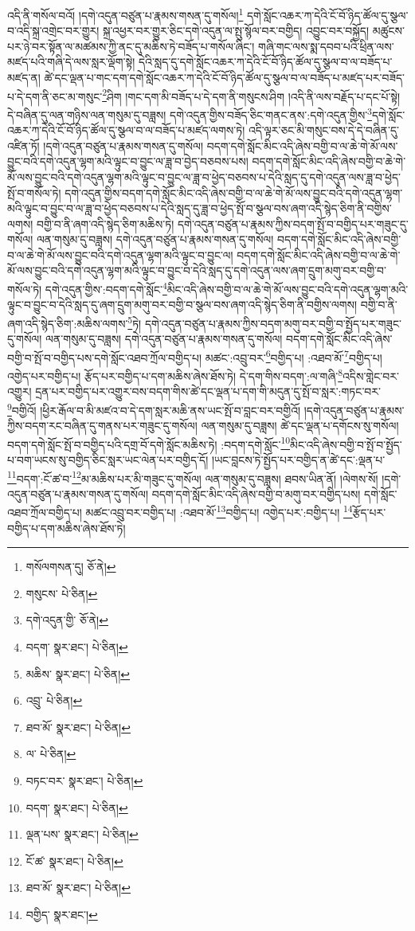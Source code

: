 འདི་ནི་གསོལ་བའོ། །དགེ་འདུན་བཙུན་པ་རྣམས་གསན་དུ་གསོལ།\footnote{གསོལགསན་དུ།  ཅོ་ནེ། } དགེ་སློང་འཆར་ཀ་དེའི་ངོ་བོ་ཉིད་ཚོལ་དུ་སྩལ་བ་འདི་སྐྲ་འགྲེང་བར་གྱུར། སྐྲ་འཕྱར་བར་གྱུར་ཅིང་དགེ་འདུན་ལ་སྤུ་སྙོལ་བར་བགྱིད། འབྱུང་བར་བསྐྱོད། མཚུངས་པར་ཉེ་བར་སྟོན་ལ་མཚམས་ཀྱི་ནང་དུ་མཆིས་ཏེ་བཟོད་པ་གསོལ་ཞིང་། གཞི་གང་ལས་སྨ་དབབ་པའི་ཕྲིན་ལས་མཛད་པའི་གཞི་དེ་ལས་སླར་ལྡོག་སྟེ། དེའི་སླད་དུ་དགེ་སློང་འཆར་ཀ་དེའི་ངོ་བོ་ཉིད་ཚོལ་དུ་སྩལ་བ་ལ་བཟོད་པ་མཛད་ན། ཚེ་དང་ལྡན་པ་གང་དག་དགེ་སློང་འཆར་ཀ་དེའི་ངོ་བོ་ཉིད་ཚོལ་དུ་སྩལ་བ་ལ་བཟོད་པ་མཛད་པར་བཟོད་པ་དེ་དག་ནི་ཅང་མ་གསུང་\footnote{གསུངས་  པེ་ཅིན། }ཤིག །གང་དག་མི་བཟོད་པ་དེ་དག་ནི་གསུངས་ཤིག །འདི་ནི་ལས་བརྗོད་པ་དང་པོ་སྟེ། དེ་བཞིན་དུ་ལན་གཉིས་ལན་གསུམ་དུ་བཟླས། དགེ་འདུན་གྱིས་བཟོད་ཅིང་གནང་ནས་:དགེ་འདུན་གྱིས་\footnote{དགེ་འདུན་གྱི་  ཅོ་ནེ། }དགེ་སློང་འཆར་ཀ་དེའི་ངོ་བོ་ཉིད་ཚོལ་དུ་སྩལ་བ་ལ་བཟོད་པ་མཛད་ལགས་ཏེ། འདི་ལྟར་ཅང་མི་གསུང་བས་དེ་དེ་བཞིན་དུ་འཛིན་ཏོ། །དགེ་འདུན་བཙུན་པ་རྣམས་གསན་དུ་གསོལ། བདག་དགེ་སློང་མིང་འདི་ཞེས་བགྱི་བ་ལ་ཆེ་གེ་མོ་ལས་བྱུང་བའི་དགེ་འདུན་ལྷག་མའི་ལྟུང་བ་བྱུང་ལ་ཟླ་བ་བྱེད་བཅབས་པས། བདག་དགེ་སློང་མིང་འདི་ཞེས་བགྱི་བ་ཆེ་གེ་མོ་ལས་བྱུང་བའི་དགེ་འདུན་ལྷག་མའི་ལྟུང་བ་བྱུང་ལ་ཟླ་བ་ཕྱེད་བཅབས་པ་དེའི་སླད་དུ་དགེ་འདུན་ལས་ཟླ་བ་ཕྱེད་སྤོ་བ་གསོལ་ཏེ། དགེ་འདུན་གྱིས་བདག་དགེ་སློང་མིང་འདི་ཞེས་བགྱི་བ་ལ་ཆེ་གེ་མོ་ལས་བྱུང་བའི་དགེ་འདུན་ལྷག་མའི་ལྟུང་བ་བྱུང་བ་ལ་ཟླ་བ་ཕྱེད་བཅབས་པ་དེའི་སླད་དུ་ཟླ་བ་ཕྱེད་སྤོ་བ་སྩལ་བས་ཞག་འདི་སྙེད་ཅིག་ནི་བགྱིས་ལགས། བགྱི་བ་ནི་ཞག་འདི་སྙེད་ཅིག་མཆིས་ཏེ། དགེ་འདུན་བཙུན་པ་རྣམས་ཀྱིས་བདག་སྤོ་བ་བགྱིད་པར་གཟུང་དུ་གསོལ། ལན་གསུམ་དུ་བཟླས། དགེ་འདུན་བཙུན་པ་རྣམས་གསན་དུ་གསོལ། བདག་དགེ་སློང་མིང་འདི་ཞེས་བགྱི་བ་ལ་ཆེ་གེ་མོ་ལས་བྱུང་བའི་དགེ་འདུན་ལྷག་མའི་ལྟུང་བ་བྱུང་ལ། བདག་དགེ་སློང་མིང་འདི་ཞེས་བགྱི་བ་ལ་ཆེ་གེ་མོ་ལས་བྱུང་བའི་དགེ་འདུན་ལྷག་མའི་ལྟུང་བ་བྱུང་བ་དེའི་སླད་དུ་དགེ་འདུན་ལས་ཞག་དྲུག་མགུ་བར་བགྱི་བ་གསོལ་ཏེ། དགེ་འདུན་གྱིས་:བདག་དགེ་སློང་\footnote{བདག་  སྣར་ཐང་།  པེ་ཅིན། }མིང་འདི་ཞེས་བགྱི་བ་ལ་ཆེ་གེ་མོ་ལས་བྱུང་བའི་དགེ་འདུན་ལྷག་མའི་ལྟུང་བ་བྱུང་བ་དེའི་སླད་དུ་ཞག་དྲུག་མགུ་བར་བགྱི་བ་སྩལ་བས་ཞག་འདི་སྙེད་ཅིག་ནི་བགྱིས་ལགས། བགྱི་བ་ནི་ཞག་འདི་སྙེད་ཅིག་:མཆིས་ལགས་\footnote{མཆིས་  སྣར་ཐང་།  པེ་ཅིན། }ཏེ། དགེ་འདུན་བཙུན་པ་རྣམས་ཀྱིས་བདག་མགུ་བར་བགྱི་བ་སྤྱོད་པར་གཟུང་དུ་གསོལ། ལན་གསུམ་དུ་བཟླས། དགེ་འདུན་བཙུན་པ་རྣམས་གསན་དུ་གསོལ། བདག་དགེ་སློང་མིང་འདི་ཞེས་བགྱི་བ་སྤོ་བ་བགྱིད་པས་དགེ་སློང་འཐབ་ཀྲོལ་བགྱིད་པ། མཚང་:འབྲུ་བར་\footnote{འབྲུ་  པེ་ཅིན། }བགྱིད་པ། :འཐབ་མོ་\footnote{ཐབ་མོ་  སྣར་ཐང་།  པེ་ཅིན། }བགྱིད་པ། འགྱེད་པར་བགྱིད་པ། རྩོད་པར་བགྱིད་པ་དག་མཆིས་ཞེས་ཐོས་ཏེ། དེ་དག་གིས་བདག་:ལ་གཞི་\footnote{ལ་  པེ་ཅིན། }འདིས་གླེང་བར་འགྱུར། དྲན་པར་བགྱིད་པར་འགྱུར་བས་བདག་གིས་ཚེ་དང་ལྡན་པ་དག་གི་མདུན་དུ་སྤོ་བ་སླར་:གཏང་བར་\footnote{བཏང་བར་  སྣར་ཐང་།  པེ་ཅིན། }བགྱིའོ། །ཕྱིར་རྒོལ་བ་མི་མཛའ་བ་དེ་དག་སླར་མཆི་ནས་ཡང་སྤོ་བ་བླང་བར་བགྱིའོ། །དགེ་འདུན་བཙུན་པ་རྣམས་ཀྱིས་བདག་རང་བཞིན་དུ་གནས་པར་གཟུང་དུ་གསོལ། ལན་གསུམ་དུ་བཟླས། ཚེ་དང་ལྡན་པ་དགོངས་སུ་གསོལ། བདག་དགེ་སློང་སྤོ་བ་བགྱིད་པའི་དགྲ་བོ་དགེ་སློང་མཆིས་ཏེ། :བདག་དགེ་སློང་\footnote{བདག་  སྣར་ཐང་།  པེ་ཅིན། }མིང་འདི་ཞེས་བགྱི་བ་སྤོ་བ་སྤྱོད་པ་བག་ཡངས་སུ་བགྱིད་ཅིང་སླར་ཡང་ལེན་པར་བགྱིད་དོ། །ཡང་བླངས་ཏེ་སྤྱོད་པར་བགྱིད་ན་ཚེ་དང་:ལྡན་པ་\footnote{ལྡན་པས་  སྣར་ཐང་།  པེ་ཅིན། }བདག་:ངོ་ཚ་བ་\footnote{ངོ་ཚ་  སྣར་ཐང་།  པེ་ཅིན། }མ་མཆིས་པར་མི་གཟུང་དུ་གསོལ། ལན་གསུམ་དུ་བཟླས། ཐབས་ཡིན་ནོ། །ལེགས་སོ། །དགེ་འདུན་བཙུན་པ་རྣམས་གསན་དུ་གསོལ། བདག་དགེ་སློང་མིང་འདི་ཞེས་བགྱི་བ་མགུ་བར་བགྱིད་པས། དགེ་སློང་འཐབ་ཀྲོལ་བགྱིད་པ། མཚང་འབྲུ་བར་བགྱིད་པ། :འཐབ་མོ་\footnote{ཐབ་མོ་  སྣར་ཐང་།  པེ་ཅིན། }བགྱིད་པ། འགྱེད་པར་:བགྱིད་པ། \footnote{བགྱིད་  སྣར་ཐང་། }རྩོད་པར་བགྱིད་པ་དག་མཆིས་ཞེས་ཐོས་ཏེ། 